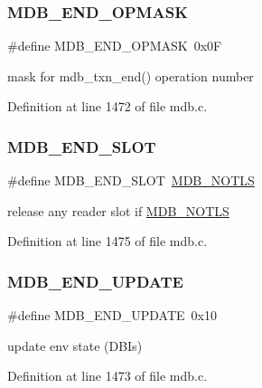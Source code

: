 \subsubsection{\texorpdfstring{M\+D\+B\+\_\+\+E\+N\+D\+\_\+\+O\+P\+M\+A\+SK}{MDB\_END\_OPMASK}}
{\footnotesize\ttfamily \#define M\+D\+B\+\_\+\+E\+N\+D\+\_\+\+O\+P\+M\+A\+SK~0x0F}

mask for mdb\+\_\+txn\+\_\+end() operation number 

Definition at line 1472 of file mdb.\+c.

\mbox{\label{group__internal_gab6f1e210f86ed62e06cfa9accb48c7f2}} 
\subsubsection{\texorpdfstring{M\+D\+B\+\_\+\+E\+N\+D\+\_\+\+S\+L\+OT}{MDB\_END\_SLOT}}
{\footnotesize\ttfamily \#define M\+D\+B\+\_\+\+E\+N\+D\+\_\+\+S\+L\+OT~\mbox{\hyperlink{group__mdb__env_ga5dca84a576d14b4bfe2deddc2dc622d3}{M\+D\+B\+\_\+\+N\+O\+T\+LS}}}

release any reader slot if \mbox{\hyperlink{group__mdb__env_ga5dca84a576d14b4bfe2deddc2dc622d3}{M\+D\+B\+\_\+\+N\+O\+T\+LS}} 

Definition at line 1475 of file mdb.\+c.

\mbox{\label{group__internal_ga2c5fdbe99b689b581138a007499cd79a}} 
\subsubsection{\texorpdfstring{M\+D\+B\+\_\+\+E\+N\+D\+\_\+\+U\+P\+D\+A\+TE}{MDB\_END\_UPDATE}}
{\footnotesize\ttfamily \#define M\+D\+B\+\_\+\+E\+N\+D\+\_\+\+U\+P\+D\+A\+TE~0x10}

update env state (D\+B\+Is) 

Definition at line 1473 of file mdb.\+c.

